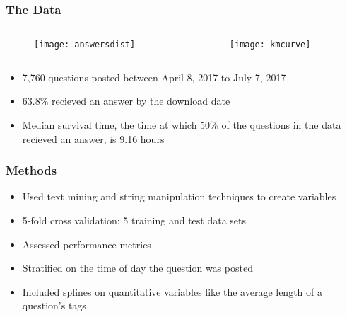 \documentclass{beamer}
\begin{document}
\begin{frame}

\frametitle{The Data}
  
  \begin{columns}
      \begin{column}{0.5\textwidth}
          \begin{figure}
            \texttt{[image: answersdist]} 
          \end{figure}
      \end{column}
      \begin{column}{0.5\textwidth}
          \begin{figure}
            \texttt{[image: kmcurve]}
          \end{figure}
      \end{column}
  \end{columns}
  
\bigskip

  \begin{itemize}
      \item 7,760 questions posted between April 8, 2017 to July 7, 2017
      \item 63.8\% recieved an answer by the download date
      \item Median survival time, the time at which 50\% of the questions in the data recieved an answer, is 9.16 hours
  \end{itemize}
  
\end{frame}

\begin{frame}
\frametitle{Methods}
  
  \begin{itemize}
      \item Used text mining and string manipulation techniques to create variables
      \item 5-fold cross validation: 5 training and test data sets 
      \item Assessed performance metrics
      \item Stratified on the time of day the question was posted
      \item Included splines on quantitative variables like the average length of a question's tags
  \end{itemize}
  
\end{frame}
\end{document}
